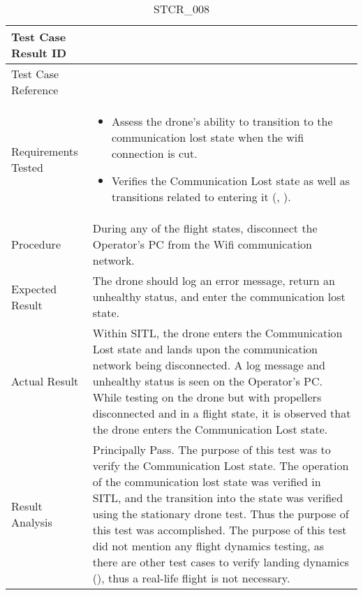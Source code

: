 \documentclass[12pt, titlepage]{article}
\begin{document}
\begin{table}[!h]
\begin{center}
\caption {STCR\_008}
\label{tab:STCR_008}
\begin{tabular}{ | m{3.2cm} | m{12.2cm} | } 
\hline
Test Case Result ID & \nameref{tab:STCR_008} \\ 
\hline
Test Case Reference & \nameref{tab:STC_008}  \\ 
\hline
Requirements Tested &
\begin{itemize}
    \item Assess the drone's ability to transition to the communication lost state when the wifi connection is cut.
    \item Verifies the Communication Lost state as well as transitions related to entering it (\nameref{STA_010}, \nameref{TRANS_010}).
\end{itemize} 
\\ 
\hline
Procedure & During any of the flight states, disconnect the Operator's PC from the Wifi communication network.     \\ 
\hline
Expected Result & The drone should log an error message, return an unhealthy status, and enter the communication lost state.   \\ 
\hline
Actual Result & Within SITL, the drone enters the Communication Lost state and lands upon the communication network being disconnected. A log message and unhealthy status is seen on the Operator's PC. While testing on the drone but with propellers disconnected and in a flight state, it is observed that the drone enters the Communication Lost state.  \\ 
\hline
Result Analysis & Principally Pass. The purpose of this test was to verify the Communication Lost state. The operation of the communication lost state was verified in SITL, and the transition into the state was verified using the stationary drone test. Thus the purpose of this test was accomplished. The purpose of this test did not mention any flight dynamics testing, as there are other test cases to verify landing dynamics (\nameref{tab:STCR_003}), thus a real-life flight is not necessary.   \\ 
\hline
\end{tabular}
\end{center}
\end{table}
\end{document}
